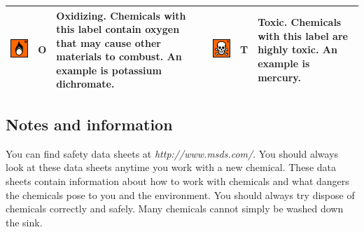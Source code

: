\begin{table}[H]
\begin{center}
\begin{tabular}{|l|c|p{3cm}|l|c|p{3cm}|}
\parbox[c]{4em}{\includegraphics[width=.1\textwidth]{photos/oxidise.png}} & O & Oxidizing. Chemicals with this label contain oxygen that may cause other materials to combust. An example is potassium dichromate. & \parbox[c]{4em}{\includegraphics[width=.1\textwidth]{photos/toxic.png}} & T & Toxic. Chemicals with this label are highly toxic. An example is mercury. \\ \hline 
  \end{tabular}
 \end{center}
\end{table}
\subsection*{Notes and information}
You can find safety data sheets at \textsl{http://www.msds.com/}. You should always look at these data sheets anytime you work with a new chemical. These data sheets contain information about how to work with chemicals and what dangers the chemicals pose to you and the environment. You should always try dispose of chemicals correctly and safely. Many chemicals cannot simply be washed down the sink. 

